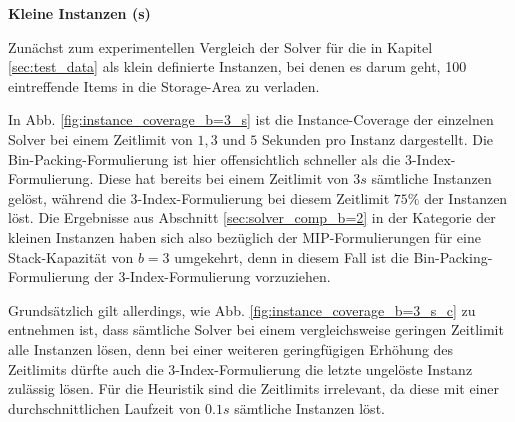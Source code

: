\textbf{Kleine Instanzen (s)}

Zunächst zum experimentellen Vergleich der Solver für die in Kapitel \ref{sec:test_data} als klein definierte
Instanzen, bei denen es darum geht, 100 eintreffende Items in die Storage-Area zu verladen.

In Abb. \ref{fig:instance_coverage_b=3_s} ist die Instance-Coverage der einzelnen Solver bei einem Zeitlimit von $1, 3$
und $5$ Sekunden pro Instanz dargestellt. Die Bin-Packing-Formulierung ist hier offensichtlich schneller als die 3-Index-Formulierung.
Diese hat bereits bei einem Zeitlimit von $3s$ sämtliche Instanzen gelöst, während die 3-Index-Formulierung
bei diesem Zeitlimit $75 \%$ der Instanzen löst. Die Ergebnisse aus Abschnitt \ref{sec:solver_comp_b=2} in der Kategorie der kleinen
Instanzen haben sich also bezüglich der MIP-Formulierungen für eine Stack-Kapazität von $b = 3$ umgekehrt, denn in diesem Fall
ist die Bin-Packing-Formulierung der 3-Index-Formulierung vorzuziehen.

Grundsätzlich gilt allerdings, wie Abb. \ref{fig:instance_coverage_b=3_s_c} zu entnehmen ist, dass sämtliche Solver
bei einem vergleichsweise geringen Zeitlimit alle Instanzen lösen, denn bei einer weiteren geringfügigen Erhöhung des Zeitlimits
dürfte auch die 3-Index-Formulierung die letzte ungelöste Instanz zulässig lösen.
Für die Heuristik sind die Zeitlimits irrelevant, da diese mit einer durchschnittlichen Laufzeit
von $0.1s$ sämtliche Instanzen löst.

